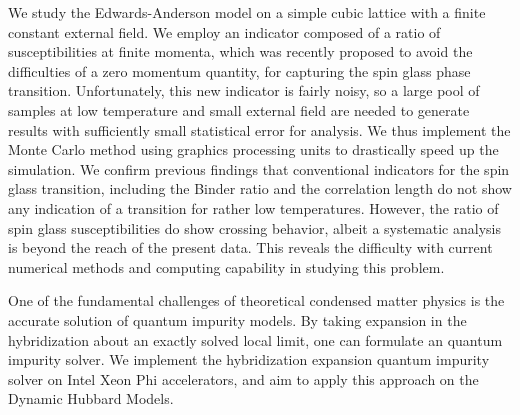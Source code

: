 \documentclass[edeposit,fullpage]{uiucthesis07}
\begin{document}
We study the Edwards-Anderson model on a simple cubic lattice with a finite 
constant external field. We employ an indicator composed of a ratio of 
susceptibilities at finite momenta, which was recently proposed to avoid 
the difficulties of a zero momentum quantity, for capturing the spin glass 
phase transition. Unfortunately, this new indicator is fairly noisy, so 
a large pool of samples at low temperature and small external field are 
needed to generate results with sufficiently small statistical error for 
analysis.  We thus implement the Monte Carlo method using graphics 
processing units to drastically speed up the simulation. We confirm previous 
findings that conventional indicators for the spin glass transition, including 
the Binder ratio and the correlation length do not show any indication of a 
transition for rather low temperatures.  However, the ratio of spin glass 
susceptibilities do show crossing behavior, albeit a systematic analysis 
is beyond the reach of the present data. 
This reveals the difficulty with current numerical methods and computing capability
in studying this problem.


One of the fundamental challenges of theoretical condensed matter physics is 
the accurate solution of quantum impurity models. By taking expansion in the 
hybridization about an exactly solved local limit, one can formulate an quantum
impurity solver. We implement the hybridization expansion quantum impurity
solver on Intel Xeon Phi accelerators, and aim to apply this approach on the
Dynamic Hubbard Models.





\mainmatter





%
%


{
\backmatter

}

\appendix

\end{document}
